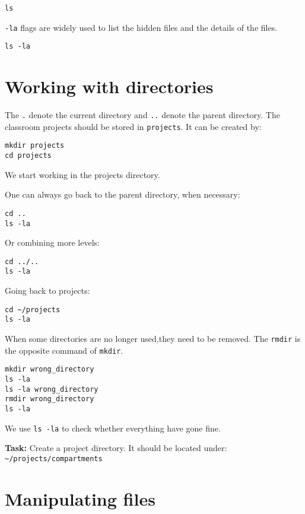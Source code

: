 \documentclass{article}\usepackage[]{graphicx}\usepackage[usenames,dvipsnames]{color}
\begin{document}
\begin{verbatim}
ls
\end{verbatim}

\verb+-la+ flags are widely used to list the hidden files and the details of the files. 

\begin{verbatim}
ls -la
\end{verbatim}

\section{Working with directories}

The \verb+.+ denote the current directory and \verb+..+ denote the parent directory. The classroom projects should be stored in \verb+projects+. It can be created by:

\begin{verbatim}
mkdir projects
cd projects
\end{verbatim}

We start working in the projects directory.

One can always go back to the parent directory, when necessary:
\begin{verbatim}
cd ..
ls -la
\end{verbatim}

Or combining more levels:

\begin{verbatim}
cd ../..
ls -la
\end{verbatim}

Going back to projects:

\begin{verbatim}
cd ~/projects
ls -la
\end{verbatim}

When some directories are no longer used,they need to be removed. The \verb+rmdir+ is the opposite command of \verb+mkdir+.

\begin{verbatim}
mkdir wrong_directory
ls -la
ls -la wrong_directory
rmdir wrong_directory
ls -la
\end{verbatim}

We use \verb+ls -la+ to check whether everything have gone fine.

\textbf{Task:} Create a project directory. It should be located under: \verb+~/projects/compartments+

\section{Manipulating files}
\end{document}
